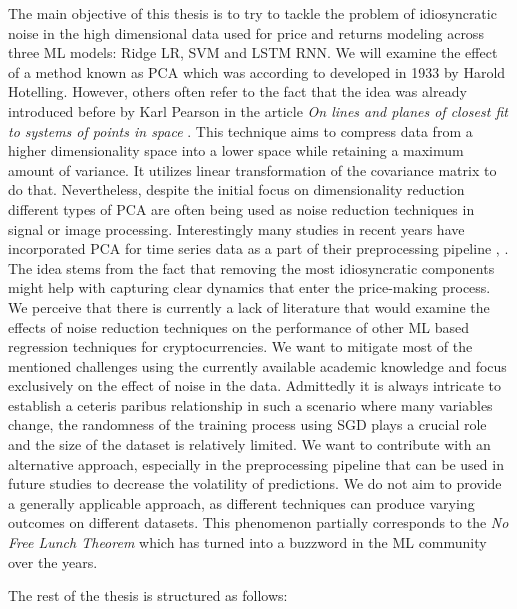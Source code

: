 The main objective of this thesis is to try to tackle the problem of idiosyncratic noise in
the high dimensional data used for price and returns modeling across three ML models: Ridge \ac{LR}, \ac{SVM}
and \ac{LSTM} \ac{RNN}.
We will examine the effect of a method known as \ac{PCA} which was according to 
\cite{Farebrother2022} developed in 1933 by Harold Hotelling. However, others often refer
to the fact 
that the idea was already introduced before by Karl Pearson in the article 
\textit{On lines and planes of closest fit to systems of points in space} \cite{Pearson1901}.
This technique aims to compress data from a higher dimensionality space into a lower space while 
retaining a maximum amount of variance. It utilizes linear transformation of the covariance matrix
to do that.
Nevertheless, despite the initial focus on dimensionality reduction different types of 
\ac{PCA} are often being used as noise reduction techniques in signal or image processing.
Interestingly many studies in recent years have incorporated \ac{PCA} for time series data 
as a part of their preprocessing pipeline \cite{Chowdhury2018}, \cite{Kristjanpoller2018}.
The idea stems from the fact that removing the most idiosyncratic components
might help with capturing clear dynamics that enter the price-making process.
We perceive that there is currently a lack of literature that would examine the effects of 
noise reduction techniques on the performance of other \ac{ML} based regression techniques
for cryptocurrencies. We want to mitigate most of the mentioned challenges using 
the currently available academic knowledge and focus exclusively on the effect of noise in the data. 
Admittedly it is always intricate to establish a ceteris paribus relationship in such a scenario
where many variables change, the randomness of the training process using \ac{SGD} plays a crucial role 
and the size of the dataset is relatively limited. We want to contribute with an alternative approach, especially 
in the preprocessing pipeline that can be used in future studies to decrease the volatility of predictions.
We do not aim to provide a generally applicable approach, as different techniques 
can produce varying outcomes on different datasets.
This phenomenon partially corresponds to the \textit{No Free Lunch Theorem} \cite{Wolpert1995} which
has turned into a buzzword in the \ac{ML} community over the years.


The rest of the thesis is structured as follows:


